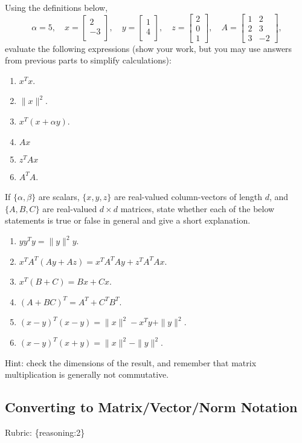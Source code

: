 \documentclass{article}
\def\rubric#1{\gre{Rubric: \{#1\}}}{}
\def\blu#1{{\color{blu}#1}}
\def\gre#1{{\color{gre}#1}}
\def\norm#1{\|#1\|}
\def\enum#1{\begin{enumerate}#1\end{enumerate}}
\begin{document}
\noindent Using the definitions below,
\[
\alpha = 5,\quad
x = \left[\begin{array}{c}
2\\
-3\\
\end{array}\right], \quad
y = \left[\begin{array}{c}
1\\
4\\
\end{array}\right],\quad
z = \left[\begin{array}{c}
2\\
0\\
1\end{array}\right],
\quad
A = \left[\begin{array}{ccc}
1 & 2\\
2 & 3\\
3 & -2
\end{array}\right],
\]
\blu{evaluate the following expressions} (show your work, but you may use answers from previous parts to simplify calculations):\\
\enum{
\item $x^Tx$.
\item $\norm{x}^2$.
\item $x^T(x + \alpha y)$.
\item $Ax$
\item $z^TAx$
\item $A^TA$.
}

If $\{\alpha,\beta\}$ are scalars, $\{x,y,z\}$ are real-valued column-vectors of length $d$,
and $\{A,B,C\}$ are real-valued $d\times d$ matrices, \blu{state whether each of the below statements is true or false in general
and give a short explanation.}
\enum{
\addtocounter{enumi}{6}
\item $yy^Ty = \norm{y}^2y$.
\item $x^TA^T(Ay + Az) = x^TA^TAy + z^TA^TAx$.
\item $x^T(B + C) = Bx + Cx$.
\item $(A + BC)^T = A^T + C^TB^T$.
\item $(x-y)^T(x-y) = \norm{x}^2 - x^Ty + \norm{y}^2$.
\item $(x-y)^T(x+y) = \norm{x}^2 - \norm{y}^2$.
}

Hint: check the dimensions of the result, and remember that matrix multiplication is generally not commutative.

\subsection{Converting to Matrix/Vector/Norm Notation}
\rubric{reasoning:2}
\end{document}

